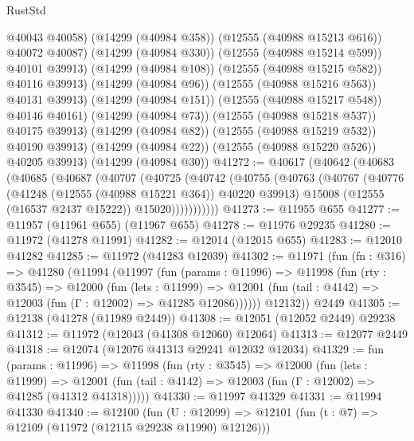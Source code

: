 \begin{lexlean}{RustStd}
\begin{coremodule}
                      @40043
                      @40058)
                    (@14299 (@40984 @358))
                    (@12555 (@40988 @15213 @616))
                    @40072
                    @40087)
                  (@14299 (@40984 @330))
                  (@12555 (@40988 @15214 @599))
                  @40101
                  @39913)
                (@14299 (@40984 @108))
                (@12555 (@40988 @15215 @582))
                @40116
                @39913)
              (@14299 (@40984 @96))
              (@12555 (@40988 @15216 @563))
              @40131
              @39913)
            (@14299 (@40984 @151))
            (@12555 (@40988 @15217 @548))
            @40146
            @40161)
          (@14299 (@40984 @73))
          (@12555 (@40988 @15218 @537))
          @40175
          @39913)
        (@14299 (@40984 @82))
        (@12555 (@40988 @15219 @532))
        @40190
        @39913)
      (@14299 (@40984 @22))
      (@12555 (@40988 @15220 @526))
      @40205
      @39913)
    (@14299 (@40984 @30))
@41272 := @40617
    (@40642
      (@40683
        (@40685
          (@40687
            (@40707
              (@40725
                (@40742
                  (@40755
                    (@40763
                      (@40767
                        (@40776
                          (@41248 (@12555 (@40988 @15221 @364)) @40220 @39913)
                          @15008
                          (@12555 (@16537 @2437 @15222))
                          @15020)))))))))))
@41273 := @11955 @655
@41277 := @11957 (@11961 @655) (@11967 @655)
@41278 := @11976 @29235
@41280 := @11972 (@41278 @11991)
@41282 := @12014 (@12015 @655)
@41283 := @12010 @41282
@41285 := @11972 (@41283 @12039)
@41302 := @11971
    (fun (fn : @316) =>
    @41280
      (@11994
        (@11997
          (fun (params : @11996) =>
          @11998
            (fun (rty : @3545) =>
            @12000
              (fun (lets : @11999) =>
              @12001 (fun (tail : @4142) => @12003 (fun (Γ : @12002) => @41285 @12086))))))
        @12132))
    @2449
@41305 := @12138 (@41278 (@11989 @2449))
@41308 := @12051 (@12052 @2449) @29238
@41312 := @11972 (@12043 (@41308 @12060) @12064)
@41313 := @12077 @2449
@41318 := @12074 (@12076 @41313 @29241 @12032 @12034)
@41329 := fun (params : @11996) =>
  @11998
    (fun (rty : @3545) =>
    @12000
      (fun (lets : @11999) =>
      @12001 (fun (tail : @4142) => @12003 (fun (Γ : @12002) => @41285 (@41312 @41318)))))
@41330 := @11997 @41329
@41331 := @11994 @41330
@41340 := @12100
    (fun (U : @12099) => @12101 (fun (t : @7) => @12109 (@11972 (@12115 @29238 @11990) @12126)))

\end{coremodule}
\end{lexlean}
